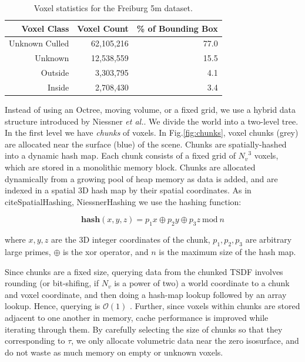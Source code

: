 \documentclass[conference]{IEEEtran}
\newcommand{\figref}[1]{Fig.\ref{#1}}
\newcommand{\etal}{\textit{et al.}\xspace}
\newcommand{\TSDF}{TSDF\xspace}
\begin{document}
\begin{table}[t!]
\centering
	\begin{tabular} {rrr}
	\toprule
	Voxel Class & Voxel Count & \% of Bounding Box \\ 
	\midrule
	Unknown Culled & 62,105,216 & 77.0 \\ 
	Unknown & 12,538,559 & 15.5 \\ 
	Outside & 3,303,795 & 4.1 \\ 
	Inside & 2,708,430 & 3.4 \\ 
	\bottomrule
	\end{tabular}
	\caption{Voxel statistics for the Freiburg 5m dataset.}
	\label{table:volumecount}  
\end{table}

Instead of using an Octree, moving volume, or a fixed grid, we use a hybrid data
structure introduced by Niessner \etal \cite{NiessnerHashing}. We divide
the world into a two-level tree. In the first level we have \emph{chunks} of
voxels.  In \figref{fig:chunks}, voxel chunks (grey) are allocated near the
surface (blue) of the scene. Chunks are spatially-hashed \cite{SpatialHashing}
into a dynamic hash map.  Each chunk consists of a fixed grid of ${N_v}^3$
voxels, which are stored in a monolithic memory block. Chunks are allocated
dynamically from a growing pool of heap memory as data is added, and are
indexed in a spatial 3D hash map \cite{SpatialHashing} by their spatial
coordinates. As in cite{SpatialHashing, NiessnerHashing} we use the hashing
function:

\begin{equation}
\textbf{hash}(x, y, z) = p_1 x\oplus p_2 y \oplus p_3 z
~\text{mod}~n
\end{equation}

\noindent where $x, y, z$ are the 3D integer coordinates of the chunk, $p_1,
p_2, p_3$ are arbitrary large primes, $\oplus$ is the xor operator, and $n$ is
the maximum size of the hash map.

Since chunks are a fixed size, querying data from the chunked \TSDF involves
rounding (or bit-shifing, if $N_v$ is a power of two) a world coordinate to a
chunk and voxel coordinate, and then doing a hash-map lookup followed by an
array lookup. Hence, querying is $\mathcal{O}(1)$ \cite{NiessnerHashing}.
Further, since voxels within chunks are stored adjacent to one another in
memory, cache performance is improved while iterating through them. By carefully
selecting the size of chunks so that they corresponding to $\tau$, we only
allocate volumetric data near the zero isosurface, and do not waste as much
memory on empty or unknown voxels.
\end{document}
